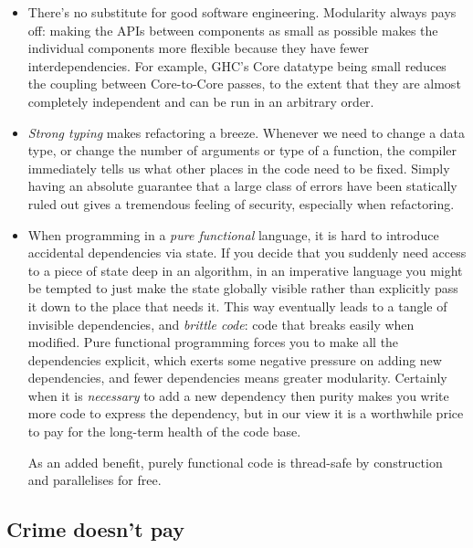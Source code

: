\documentclass{article}
\begin{document}
\begin{itemize}
\item There's no substitute for good software engineering.  Modularity
  always pays off: making the APIs between components as small as
  possible makes the individual components more flexible because they
  have fewer interdependencies.  For example, GHC's Core datatype
  being small reduces the coupling between Core-to-Core passes, to the
  extent that they are almost completely independent and can be run in
  an arbitrary order.

\item \emph{Strong typing} makes refactoring a breeze.  Whenever we
  need to change a data type, or change the number of arguments or
  type of a function, the compiler immediately tells us what other
  places in the code need to be fixed.  Simply having an absolute
  guarantee that a large class of errors have been statically ruled
  out gives a tremendous feeling of security, especially when
  refactoring.

\item When programming in a \emph{pure functional} language, it is
  hard to introduce accidental dependencies via state.  If you decide
  that you suddenly need access to a piece of state deep in an
  algorithm, in an imperative language you might be tempted to just
  make the state globally visible rather than explicitly pass it down
  to the place that needs it.  This way eventually leads to a tangle
  of invisible dependencies, and \emph{brittle code}: code that breaks
  easily when modified.  Pure functional programming forces you to
  make all the dependencies explicit, which exerts some negative
  pressure on adding new dependencies, and fewer dependencies means
  greater modularity.  Certainly when it is \emph{necessary} to add a
  new dependency then purity makes you write more code to express the
  dependency, but in our view it is a worthwhile price to pay for the
  long-term health of the code base.

  As an added benefit, purely functional code is thread-safe by
  construction and parallelises for free.
\end{itemize}

%
%

\subsection{Crime doesn't pay}
\end{document}
